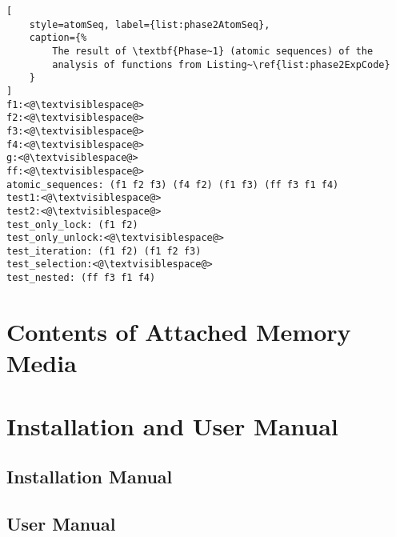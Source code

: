\begin{lstlisting}[
    style=atomSeq, label={list:phase2AtomSeq},
    caption={%
        The result of \textbf{Phase~1} (atomic sequences) of the
        analysis of functions from Listing~\ref{list:phase2ExpCode}
    }
]
f1:<@\textvisiblespace@>
f2:<@\textvisiblespace@>
f3:<@\textvisiblespace@>
f4:<@\textvisiblespace@>
g:<@\textvisiblespace@>
ff:<@\textvisiblespace@>
atomic_sequences: (f1 f2 f3) (f4 f2) (f1 f3) (ff f3 f1 f4)
test1:<@\textvisiblespace@>
test2:<@\textvisiblespace@>
test_only_lock: (f1 f2)
test_only_unlock:<@\textvisiblespace@>
test_iteration: (f1 f2) (f1 f2 f3)
test_selection:<@\textvisiblespace@>
test_nested: (ff f3 f1 f4)
\end{lstlisting}



\chapter{Contents of Attached Memory Media}
\label{app:memMedia}




\chapter{Installation and User Manual}
\label{app:man}



\section{Installation Manual}
\label{sec:installMan}



\section{User Manual}
\label{sec:userMan}



